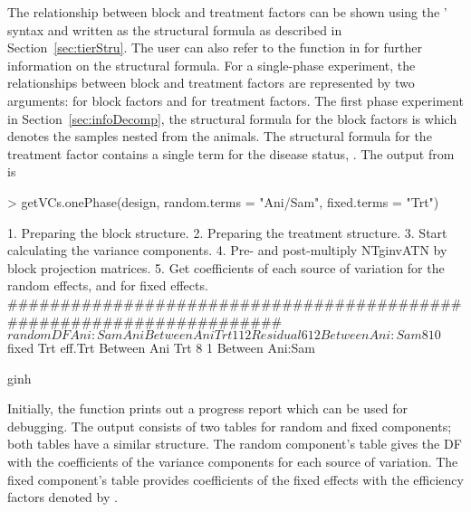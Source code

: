 \documentclass[article]{jss}
\begin{document}
The relationship between block and treatment factors can be shown using the \citeauthor{Wilkinson1973}' syntax and written as the structural formula as described in Section~\ref{sec:tierStru}. The user can also refer to the  function in  for further information on the structural formula. For a single-phase experiment, the relationships between block and treatment factors are represented by two arguments:  for block factors and  for treatment factors. The first phase experiment in Section~\ref{sec:infoDecomp}, the structural formula for the block factors is  which denotes the samples nested from the animals. The structural formula for the treatment factor contains a single term for the disease status, . The output from  is 
\begin{CodeChunk}
\begin{CodeInput}
> getVCs.onePhase(design, random.terms = "Ani/Sam", fixed.terms = "Trt")
\end{CodeInput}
\begin{CodeOutput}
1. Preparing the block structure.
2. Preparing the treatment structure.
3. Start calculating the variance components.
4. Pre- and post-multiply NTginvATN by block projection matrices.
5. Get coefficients of each source of variation for the random effects,
   and for fixed effects.
#####################################################################
$random
                DF Ani:Sam Ani
Between Ani                   
   Trt          1  1       2  
   Residual     6  1       2  
Between Ani:Sam 8  1       0  

$fixed
                Trt eff.Trt
Between Ani                
   Trt          8   1      
Between Ani:Sam            
\end{CodeOutput}ginh
\end{CodeChunk}
Initially, the function prints out a progress report which can be used for debugging. The output consists of two tables for random and fixed components; both tables have a similar structure. The random component's table gives the DF with the coefficients of the variance components for each source of variation. The fixed component's table provides coefficients of the fixed effects with the efficiency factors denoted by .
\end{document}
